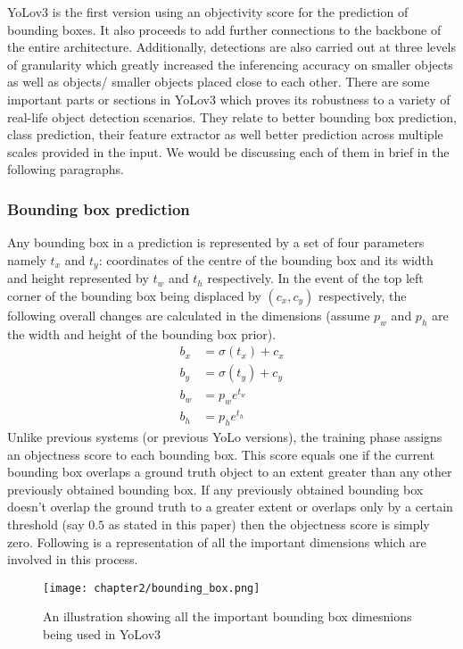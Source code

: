 YoLov3 is the first version using an objectivity score for the prediction of bounding boxes. It also proceeds to add further connections to the backbone of the entire architecture. Additionally, detections are also carried out at three levels of granularity which greatly increased the inferencing accuracy on smaller objects as well as objects/ smaller objects placed close to each other. There are some important parts or sections in YoLov3 which proves its robustness to a variety of real-life object detection scenarios. They relate to better bounding box prediction, class prediction, their feature extractor as well better prediction across multiple scales provided in the input. We would be discussing each of them in brief in the following paragraphs. \par

\subsubsection{Bounding box prediction}
Any bounding box in a prediction is represented by a set of four parameters namely $t_x$ and $t_y$: coordinates of the centre of the bounding box and its width and height represented by $t_w$ and $t_h$ respectively. In the event of the top left corner of the bounding box being displaced by $(c_x,c_y)$ respectively, the following overall changes are calculated in the dimensions (assume $p_w$ and $p_h$ are the width and height of the bounding box prior).
\begin{align*}
b_x &=  \sigma(t_x) + c_x \\
b_y &=  \sigma(t_y) + c_y \\
b_w &=  {p_w}e^{t_w} \\
b_h &=  {p_h}e^{t_h}
\end{align*}
Unlike previous systems (or previous YoLo versions), the training phase assigns an objectness score to each bounding box. This score equals one if the current bounding box overlaps a ground truth object to an extent greater than any other previously obtained bounding box. If any previously obtained bounding box doesn’t overlap the ground truth to a greater extent or overlaps only by a certain threshold (say $0.5$ as stated in this paper) then the objectness score is simply zero. Following is a representation of all the important dimensions which are involved in this process.

\begin{figure}
  \centering
  \texttt{[image: chapter2/bounding\_box.png]}
  \caption{An illustration showing all the important bounding box dimesnions being used in YoLov3}
  \label{fig:bbox}
\end{figure}

